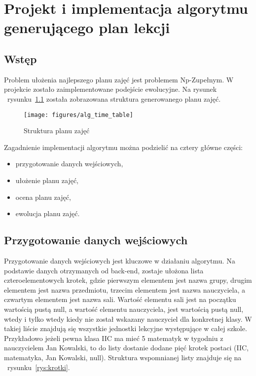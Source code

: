 
\chapter{Projekt i implementacja algorytmu generującego plan lekcji}

\section{Wstęp}
Problem ułożenia najlepszego planu zajęć jest problemem Np-Zupełnym. W projekcie zostało zaimplementowane podejście ewolucyjne. Na rysunek ~rysunku~\ref{rys:time_table_dia} została zobrazowana struktura generowanego planu zajęć.

\begin{figure}[h]
\centering\texttt{[image: figures/alg\_time\_table]}
\caption{Struktura planu zajęć}\label{rys:time_table_dia}
\end{figure}


Zagadnienie implementacji algorytmu można podzielić na cztery główne części: 
\begin{itemize}
	\item przygotowanie danych wejściowych,
	\item ułożenie planu zajęć,
	\item ocena planu zajęć,
	\item ewolucja planu zajęć.
\end{itemize}


\section{Przygotowanie danych wejściowych}
    
    Przygotowanie danych wejściowych jest kluczowe w działaniu algorytmu. Na podstawie danych otrzymanych od back-end, zostaje ułożona lista czteroelementowych krotek, gdzie pierwszym elementem jest nazwa grupy, drugim elementem jest nazwa przedmiotu, trzecim elementem jest nazwa nauczyciela, a czwartym elementem jest nazwa sali. Wartość elementu sali jest na początku wartością pustą null, a wartość elementu nauczyciela, jest wartością pustą null, wtedy i tylko wtedy kiedy nie został wskazany nauczyciel dla konkretnej klasy. W takiej liście znajdują się wszystkie jednostki lekcyjne występujące w całej szkole. Przykładowo jeżeli pewna klasa IIC ma mieć 5 matematyk w tygodniu z nauczycielem Jan Kowalski, to do listy dostanie dodane pięć krotek postaci (IIC, matematyka, Jan Kowalski, null). Struktura wspomnianej listy znajduje się na ~rysunku~\ref{rys:krotki}.


